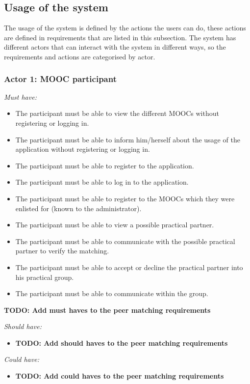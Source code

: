 \documentclass[]{article}
\newcommand{\TODO}[1]{{\color{red}\textbf{TODO: #1}}}
\begin{document}
\subsection{Usage of the system}
The usage of the system is defined by the actions the users can do, these actions are defined in requirements that are listed in this subsection.
The system has different actors that can interact with the system in different ways, so the requirements and actions are categorised by actor.

\subsubsection{Actor 1: MOOC participant}
\emph{Must have:}
\begin{itemize}
\item The participant must be able to view the different MOOCs without registering or logging in.
\item The participant must be able to inform him/herself about the usage of the application without registering or logging in.
\item The participant must be able to register to the application.
\item The participant must be able to log in to the application.
\item The participant must be able to register to the MOOCs which they were enlisted for (known to the administrator).
\item The participant must be able to view a possible practical partner.
\item The participant must be able to communicate with the possible practical partner to verify the matching.
\item The participant must be able to accept or decline the practical partner into his practical group.
\item The participant must be able to communicate within the group.
\end{itemize}
\TODO{Add must haves to the peer matching requirements}

\emph{Should have:}
\begin{itemize}
\item \TODO{Add should haves to the peer matching requirements}
\end{itemize}

\emph{Could have:}
\begin{itemize}
\item \TODO{Add could haves to the peer matching requirements}
\end{itemize}
\end{document}
